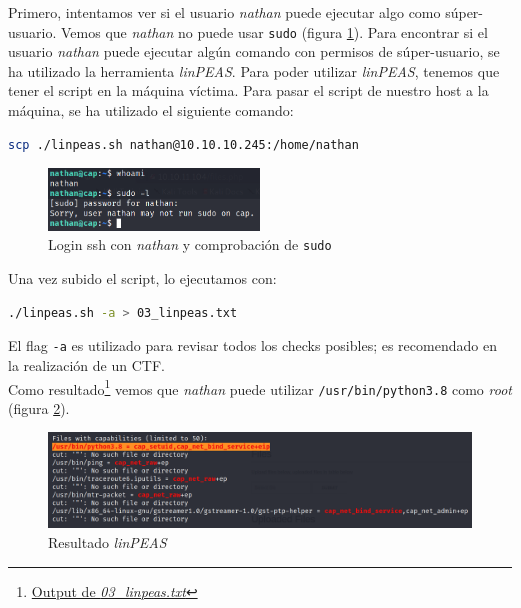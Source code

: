 Primero, intentamos ver si el usuario \textit{nathan} puede ejecutar algo como súper-usuario. Vemos que \textit{nathan} no puede usar \texttt{sudo} (figura \ref{fig:cap-nathan-sudo}). Para encontrar si el usuario \textit{nathan} puede ejecutar algún comando con permisos de súper-usuario, se ha utilizado la herramienta \textit{linPEAS}\cite{peas}. Para poder utilizar \textit{linPEAS}, tenemos que tener el script en la máquina víctima. Para pasar el script de nuestro host a la máquina, se ha utilizado el siguiente comando:
\begin{lstlisting}[language=bash]
scp ./linpeas.sh nathan@10.10.10.245:/home/nathan
\end{lstlisting}

\begin{figure}[h]
    \centering
    \includegraphics[width=0.5\textwidth]{images/machines/cap/nathan-sudo.png}
    \caption{Login \acrshort{ssh} con \textit{nathan} y comprobación de \texttt{sudo}}
    \label{fig:cap-nathan-sudo}
\end{figure}

Una vez subido el script, lo ejecutamos con:
\begin{lstlisting}[language=bash]
./linpeas.sh -a > 03_linpeas.txt
\end{lstlisting}

El flag \texttt{-a} es utilizado para revisar todos los checks posibles; es recomendado en la realización de un \acrshort{CTF}.\\

Como resultado\footnote{\href{https://github.com/VictorNS69/TFM/blob/main/machines/cap/03_linpeas.txt}{Output de \textit{03\_linpeas.txt}}} vemos que \textit{nathan} puede utilizar \texttt{/usr/bin/python3.8} como \textit{root} (figura \ref{fig:cap-linpeas}).\\

\begin{figure}[h]
    \centering
    \includegraphics[width=1.0\textwidth]{images/machines/cap/linpeas.png}
    \caption{Resultado \textit{linPEAS}}
    \label{fig:cap-linpeas}
\end{figure}

